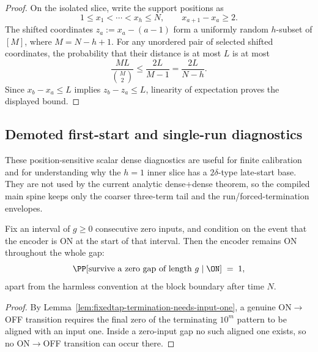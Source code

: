 \begin{proof}
On the isolated slice, write the support positions as
\[
1\le x_1<\cdots<x_h\le N,\qquad x_{a+1}-x_a\ge 2.
\]
The shifted coordinates \(z_a:=x_a-(a-1)\) form a uniformly random \(h\)-subset of \([M]\), where \(M=N-h+1\). For any
unordered pair of selected shifted coordinates, the probability that their distance is at most \(L\) is at most
\[
\frac{ML}{\binom{M}{2}}\le \frac{2L}{M-1}=\frac{2L}{N-h}.
\]
Since \(x_b-x_a\le L\) implies \(z_b-z_a\le L\), linearity of expectation proves the displayed bound.
\end{proof}

\subsection{Demoted first-start and single-run diagnostics}

These position-sensitive scalar dense diagnostics are useful for finite calibration and for understanding why the
\(h=1\) inner slice has a \(2\delta\)-type late-start base. They are not used by the current analytic dense+dense
theorem, so the compiled main spine keeps only the coarser three-term tail and the run/forced-termination envelopes.

\begin{corollary}
\label{cor:dense-gap-survival}
Fix an interval of \(g\ge0\) consecutive zero inputs, and condition on the event that the encoder is ON at the start of
that interval. Then the encoder remains ON throughout the whole gap:
\begin{equation}
\label{eq:dense-gap-survival}
\PP[\text{survive a zero gap of length }g \mid \ON]
\;=\;
1,
\end{equation}
apart from the harmless convention at the block boundary after time \(N\).
\end{corollary}

\begin{proof}
By Lemma~\ref{lem:fixedtap-termination-needs-input-one}, a genuine ON\(\to\)OFF transition requires the final zero of
the terminating \(10^m\) pattern to be aligned with an input one. Inside a zero-input gap no such aligned one exists,
so no ON\(\to\)OFF transition can occur there.
\end{proof}


